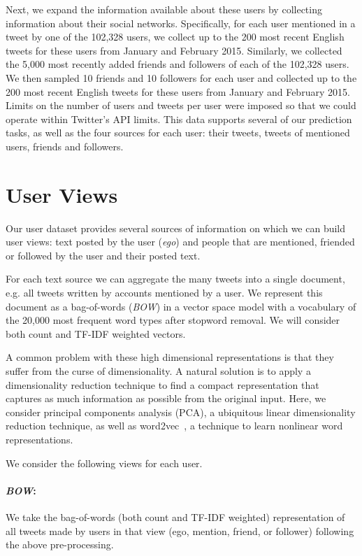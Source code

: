 \documentclass{article}
\newcommand{\bow}{\emph{BOW}} %
\newcommand{\myparagraph}[1]{\vspace{-.2cm}\paragraph{#1}}
\begin{document}
Next, we expand the information available about these users by collecting information about their social networks.
Specifically, for each user mentioned in a tweet by one of the 102,328 users, we collect up to the 200 most recent English tweets for these users from January and February 2015. Similarly, we collected the 5,000 most recently added friends and followers of each of the 102,328 users. We then sampled 10 friends and 10 followers for each user and collected up to the 200 most recent English tweets for these users from January and February 2015.
Limits on the number of users and tweets per user were imposed so that we could operate within Twitter's API limits.
This data supports several of our prediction tasks, as well as the four sources for each user: their tweets, tweets of mentioned
users, friends and followers.

% 
\section{User Views}
\label{sec:user_views}
Our user dataset provides several sources of information on which we can build user views: text posted by the user ({\em ego}) and 
people that are mentioned, friended or followed by the user and their posted text.


For each text source we can aggregate the many tweets into a single document, e.g. all tweets written by accounts mentioned 
by a user.
We represent this document as a bag-of-words (\bow) in a vector space model with 
a vocabulary of the 20,000 most frequent word types after stopword removal.
We will consider both count and TF-IDF weighted vectors.


A common problem with these high dimensional representations is that they suffer from the curse of dimensionality. A natural solution is to apply a dimensionality reduction technique to find a compact representation that captures as much information as possible from the original input. Here, we consider principal components analysis (PCA), a ubiquitous linear dimensionality reduction technique, as well as word2vec~\cite{mikolov2013}, a technique to learn nonlinear word representations. 


We consider the following views for each user.
\myparagraph{\bow{}:} We take the bag-of-words (both count and TF-IDF weighted) representation of all tweets made by users in that view (ego, mention, friend, or follower) following the above pre-processing.
\end{document}
